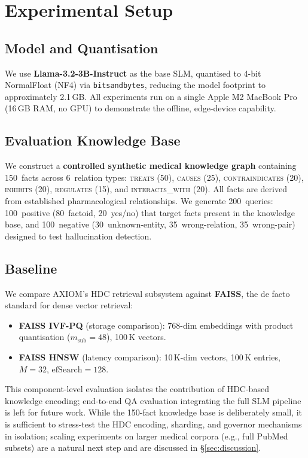 \documentclass[11pt,a4paper]{article}
\begin{document}
\section{Experimental Setup}
\label{sec:experiments}

\subsection{Model and Quantisation}
We use \textbf{Llama-3.2-3B-Instruct} as the base SLM, quantised to 4-bit
NormalFloat (NF4) via \texttt{bitsandbytes}, reducing the model footprint to
approximately 2.1\,GB.  All experiments run on a single Apple M2 MacBook Pro
(16\,GB RAM, no GPU) to demonstrate the offline, edge-device capability.

\subsection{Evaluation Knowledge Base}
We construct a \textbf{controlled synthetic medical knowledge graph}
containing 150~facts across 6~relation types: \textsc{treats} (50),
\textsc{causes} (25), \textsc{contraindicates} (20), \textsc{inhibits} (20),
\textsc{regulates} (15), and \textsc{interacts\_with} (20).
All facts are derived from established pharmacological relationships.
We generate 200~queries: 100~positive (80~factoid, 20~yes/no) that
target facts present in the knowledge base, and 100~negative
(30~unknown-entity, 35~wrong-relation, 35~wrong-pair) designed to
test hallucination detection.

\subsection{Baseline}
We compare AXIOM's HDC retrieval subsystem against \textbf{FAISS},
the de facto standard for dense vector retrieval:
\begin{itemize}[nosep]
    \item \textbf{FAISS IVF-PQ} (storage comparison): 768-dim embeddings
          with product quantisation ($m_{\text{sub}}=48$), 100\,K vectors.
    \item \textbf{FAISS HNSW} (latency comparison): 10\,K-dim vectors,
          100\,K entries, $M=32$, $\text{efSearch}=128$.
\end{itemize}
This component-level evaluation isolates the contribution of HDC-based
knowledge encoding; end-to-end QA evaluation integrating the full
SLM pipeline is left for future work.
While the 150-fact knowledge base is deliberately small, it is
sufficient to stress-test the HDC encoding, sharding, and governor
mechanisms in isolation; scaling experiments on larger medical corpora
(e.g., full PubMed subsets) are a natural next step and are discussed
in \S\ref{sec:discussion}.
\end{document}
